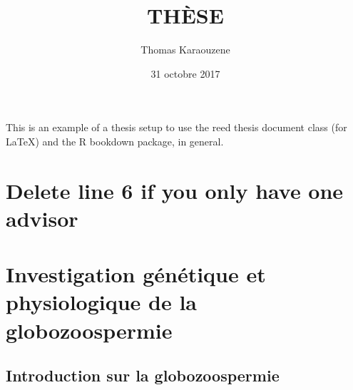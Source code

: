 \documentclass[12pt,twoside]{reedthesis}
\title{THÈSE}
\author{Thomas Karaouzene}
\date{31 octobre 2017}
\theoremstyle{definition}
\theoremstyle{definition}
\theoremstyle{remark}
\begin{document}
      \maketitle
  
  \frontmatter %
  \pagestyle{empty} %

  
      \begin{preface}
      This is an example of a thesis setup to use the reed thesis document
      class (for LaTeX) and the R bookdown package, in general.
    \end{preface}
  
      \hypersetup{linkcolor=black}
    \setcounter{tocdepth}{3}
    \tableofcontents
  
      \listoftables
  
      \listoffigures
  
  
  
  \mainmatter %
  \pagestyle{fancyplain} %

  \chapter{Delete line 6 if you only have one
  advisor}\label{delete-line-6-if-you-only-have-one-advisor}
  
  \chapter{Investigation génétique et physiologique de la
  globozoospermie}\label{globo}
  
  \section{Introduction sur la
  globozoospermie}\label{introduction-sur-la-globozoospermie}
  
\end{document}

